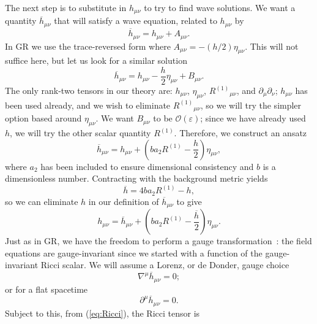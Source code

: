 \documentclass[aps,prd,amsfonts,amssymb,amsmath,nofootinbib,reprint,showpacs]{revtex4-1}
\newcommand{\eqnref}[1]{(\ref{eq:#1})}
\newcommand{\order}[1]{\ensuremath{\mathcal{O}({#1})}}
\begin{document}
The next step is to substitute in $h_{\mu\nu}$ to try to find wave solutions. We want a quantity $\overline{h}_{\mu\nu}$ that will satisfy a wave equation, related to $h_{\mu\nu}$ by
\begin{equation}
\overline{h}_{\mu\nu} = h_{\mu\nu} + A_{\mu\nu}.
\end{equation}
In GR we use the trace-reversed form where $A_{\mu\nu} = -(h/2)\eta_{\mu\nu}$. This will not suffice here, but let us look for a similar solution
\begin{equation}
\overline{h}_{\mu\nu} = h_{\mu\nu} - \frac{h}{2}\eta_{\mu\nu} + B_{\mu\nu}.
\end{equation}
The only rank-two tensors in our theory are: $h_{\mu\nu}$, $\eta_{\mu\nu}$, ${R^{(1)}}_{\mu\nu}$, and $\partial_\mu\partial_\nu$; $h_{\mu\nu}$ has been used already, and we wish to eliminate ${R^{(1)}}_{\mu\nu}$, so we will try the simpler option based around $\eta_{\mu\nu}$. We want $B_{\mu\nu}$ to be $\order{\varepsilon}$; since we have already used $h$, we will try the other scalar quantity $R^{(1)}$. Therefore, we construct an ansatz
\begin{equation}
\overline{h}_{\mu\nu} = h_{\mu\nu} + \left(b a_2 R^{(1)} - \frac{h}{2}\right)\eta_{\mu\nu},
\label{eq:Ansatz}
\end{equation}
where $a_2$ has been included to ensure dimensional consistency and $b$ is a dimensionless number. Contracting with the background metric yields
\begin{equation}
\overline{h} = 4b a_2 R^{(1)} - h,
\label{eq:h_trace}
\end{equation}
so we can eliminate $h$ in our definition of $\overline{h}_{\mu\nu}$ to give
\begin{equation}
h_{\mu\nu} = \overline{h}_{\mu\nu} + \left(b a_2 R^{(1)} -\frac{\overline{h}}{2}\right)\eta_{\mu\nu}.
\end{equation}
Just as in GR, we have the freedom to perform a gauge transformation~\cite{Misner1973, Hobson2006}: the field equations are gauge-invariant since we started with a function of the gauge-invariant Ricci scalar. We will assume a Lorenz, or de Donder, gauge choice
\begin{equation}
\nabla^\mu \overline{h}_{\mu\nu} = 0;
\end{equation}
or for a flat spacetime
\begin{equation}
\partial^\mu \overline{h}_{\mu\nu} = 0.
\label{eq:Lorenz}
\end{equation}
Subject to this, from \eqnref{Ricci}, the Ricci tensor is
\end{document}
